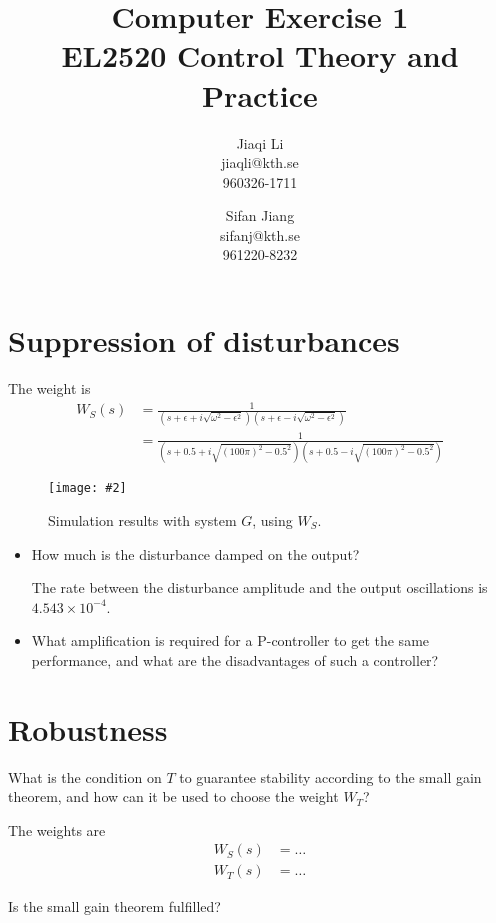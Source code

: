 \documentclass[11pt,a4paper]{article}
\title{
	Computer Exercise 1\\
	EL2520 Control Theory and Practice
}
\author{
	Jiaqi Li\\
	jiaqli@kth.se\\
	960326-1711
	\and
	Sifan Jiang\\
	sifanj@kth.se\\
	961220-8232
}
\newcommand{\image}[3]{
	\begin{figure}[!ht]
		\centering
	    \texttt{[image: \#2]}
		\caption{#3}
		\label{fig:#2}
	\end{figure}
}
\begin{document}
\maketitle


\section*{Suppression of disturbances}
\par The weight is
	\begin{align*}
		W_S(s) &= \frac{1}{(s+\epsilon+i\sqrt{\omega^{2}-\epsilon^{2}})(s+\epsilon-i\sqrt{\omega^{2}-\epsilon^{2}})} \\
		&= \frac{1}{(s+0.5+i\sqrt{(100\pi)^{2}-0.5^{2}})(s+0.5-i\sqrt{(100\pi)^{2}-0.5^{2}})}
	\end{align*}

	\image{1}{41}{Simulation results with system $G$, using $W_S$.}
	
	\begin{itemize}
		\item How much is the disturbance damped on the output?
		\par The rate between the disturbance amplitude and the output oscillations is $4.543\times 10^{-4}$.

		\item What amplification is required for a P-controller to get the same performance, and what are the disadvantages of such a controller?
		\par 
	\end{itemize}


\section*{Robustness}
\par What is the condition on $T$ to guarantee stability according to the small gain theorem, and how can it be used to choose the weight $W_T$?
\par\dotfill\par\dotfill\par

\par The weights are
	\begin{align*}
		W_S(s) &= \ldots\\
		W_T(s) &= \ldots
	\end{align*}

\par Is the small gain theorem fulfilled?
\par\dotfill\par\dotfill\par
\end{document}
